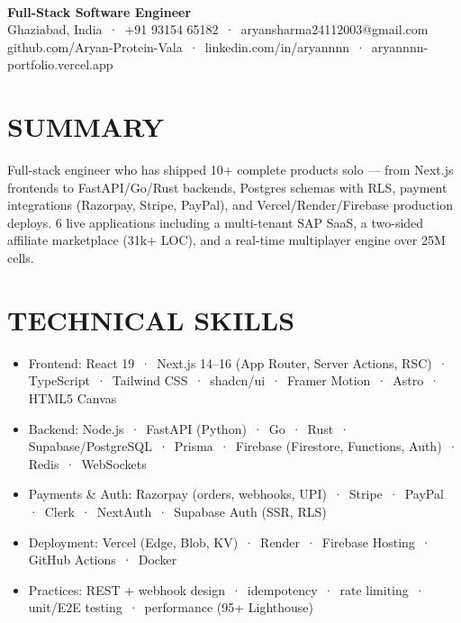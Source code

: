 \documentclass[9pt]{article}
\begin{document}
\\[3pt]
{\large\bfseries Full-Stack Software Engineer}\\[3pt]
{\small\color{greyc} Ghaziabad, India \,·\, +91 93154 65182 \,·\, aryansharma24112003@gmail.com}\vspace{-2pt}
{\small\color{greyc} github.com/Aryan-Protein-Vala \,·\, linkedin.com/in/aryannnn \,·\, aryannnn-portfolio.vercel.app}\vspace{-2pt}
\section*{SUMMARY}
Full-stack engineer who has shipped 10+ complete products solo  ---  from Next.js frontends to FastAPI/Go/Rust backends, Postgres schemas with RLS, payment integrations (Razorpay, Stripe, PayPal), and Vercel/Render/Firebase production deploys. 6 live applications including a multi-tenant SAP SaaS, a two-sided affiliate marketplace (31k+ LOC), and a real-time multiplayer engine over 25M cells.
\vspace{1pt}
\section*{TECHNICAL SKILLS}
\begin{itemize}[leftmargin=11pt,itemsep=0pt,topsep=1pt,parsep=0pt]
\item Frontend: React 19 \,·\, Next.js 14–16 (App Router, Server Actions, RSC) \,·\, TypeScript \,·\, Tailwind CSS \,·\, shadcn/ui \,·\, Framer Motion \,·\, Astro \,·\, HTML5 Canvas
\item Backend: Node.js \,·\, FastAPI (Python) \,·\, Go \,·\, Rust \,·\, Supabase/PostgreSQL \,·\, Prisma \,·\, Firebase (Firestore, Functions, Auth) \,·\, Redis \,·\, WebSockets
\item Payments \& Auth: Razorpay (orders, webhooks, UPI) \,·\, Stripe \,·\, PayPal \,·\, Clerk \,·\, NextAuth \,·\, Supabase Auth (SSR, RLS)
\item Deployment: Vercel (Edge, Blob, KV) \,·\, Render \,·\, Firebase Hosting \,·\, GitHub Actions \,·\, Docker
\item Practices: REST + webhook design \,·\, idempotency \,·\, rate limiting \,·\, unit/E2E testing \,·\, performance (95+ Lighthouse)
\end{itemize}
\end{document}
